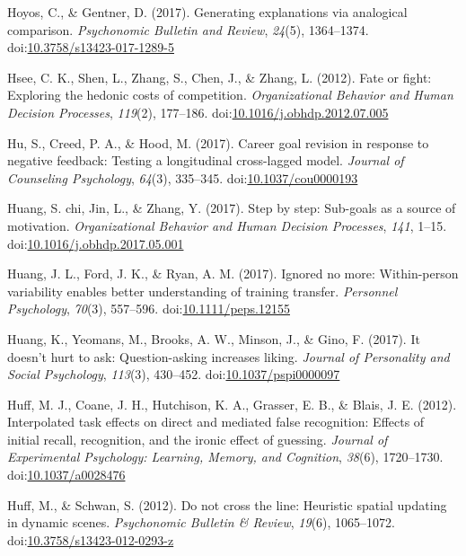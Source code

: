 \documentclass[english,man]{apa6}
\begin{document}
\hypertarget{ref-Hoyos2017}{}
Hoyos, C., \& Gentner, D. (2017). Generating explanations via analogical
comparison. \emph{Psychonomic Bulletin and Review}, \emph{24}(5),
1364--1374.
doi:\href{https://doi.org/10.3758/s13423-017-1289-5}{10.3758/s13423-017-1289-5}

\hypertarget{ref-Hsee2012}{}
Hsee, C. K., Shen, L., Zhang, S., Chen, J., \& Zhang, L. (2012). Fate or
fight: Exploring the hedonic costs of competition. \emph{Organizational
Behavior and Human Decision Processes}, \emph{119}(2), 177--186.
doi:\href{https://doi.org/10.1016/j.obhdp.2012.07.005}{10.1016/j.obhdp.2012.07.005}

\hypertarget{ref-Hu2017}{}
Hu, S., Creed, P. A., \& Hood, M. (2017). Career goal revision in
response to negative feedback: Testing a longitudinal cross-lagged
model. \emph{Journal of Counseling Psychology}, \emph{64}(3), 335--345.
doi:\href{https://doi.org/10.1037/cou0000193}{10.1037/cou0000193}

\hypertarget{ref-Huang2017}{}
Huang, S. chi, Jin, L., \& Zhang, Y. (2017). Step by step: Sub-goals as
a source of motivation. \emph{Organizational Behavior and Human Decision
Processes}, \emph{141}, 1--15.
doi:\href{https://doi.org/10.1016/j.obhdp.2017.05.001}{10.1016/j.obhdp.2017.05.001}

\hypertarget{ref-Huang2017a}{}
Huang, J. L., Ford, J. K., \& Ryan, A. M. (2017). Ignored no more:
Within-person variability enables better understanding of training
transfer. \emph{Personnel Psychology}, \emph{70}(3), 557--596.
doi:\href{https://doi.org/10.1111/peps.12155}{10.1111/peps.12155}

\hypertarget{ref-Huang2017b}{}
Huang, K., Yeomans, M., Brooks, A. W., Minson, J., \& Gino, F. (2017).
It doesn't hurt to ask: Question-asking increases liking. \emph{Journal
of Personality and Social Psychology}, \emph{113}(3), 430--452.
doi:\href{https://doi.org/10.1037/pspi0000097}{10.1037/pspi0000097}

\hypertarget{ref-Huff2012}{}
Huff, M. J., Coane, J. H., Hutchison, K. A., Grasser, E. B., \& Blais,
J. E. (2012). Interpolated task effects on direct and mediated false
recognition: Effects of initial recall, recognition, and the ironic
effect of guessing. \emph{Journal of Experimental Psychology: Learning,
Memory, and Cognition}, \emph{38}(6), 1720--1730.
doi:\href{https://doi.org/10.1037/a0028476}{10.1037/a0028476}

\hypertarget{ref-Huff2012a}{}
Huff, M., \& Schwan, S. (2012). Do not cross the line: Heuristic spatial
updating in dynamic scenes. \emph{Psychonomic Bulletin \& Review},
\emph{19}(6), 1065--1072.
doi:\href{https://doi.org/10.3758/s13423-012-0293-z}{10.3758/s13423-012-0293-z}
\end{document}
